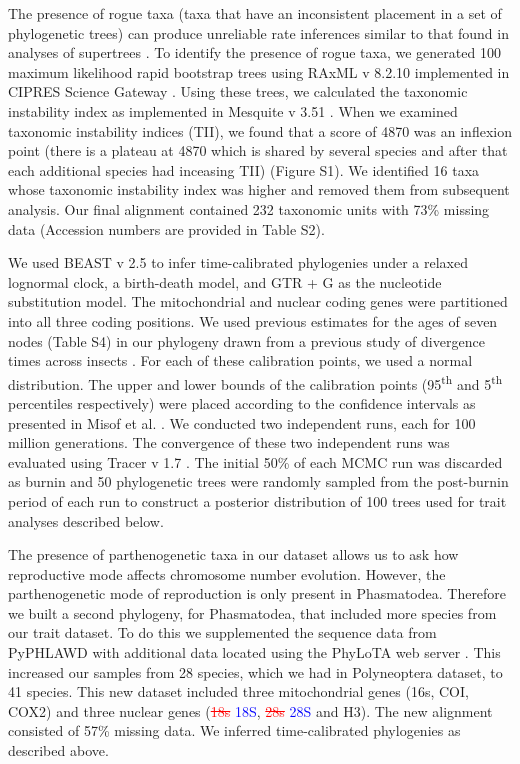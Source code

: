 \documentclass[]{rsos}%
\begin{document}
The presence of rogue taxa (taxa that have an inconsistent placement in a set of phylogenetic trees) can produce unreliable rate inferences similar to that found in analyses of supertrees \cite{aberer2012roguetaxa, rabosky2015b}.
To identify the presence of rogue taxa, we generated 100 maximum likelihood rapid bootstrap trees using RAxML v 8.2.10 implemented in CIPRES Science Gateway \cite{stamatakis2014raxml,miller2010cipres}.
Using these trees, we calculated the taxonomic instability index as implemented in Mesquite v 3.51 \cite{maddison2018mesquite}.
When we examined taxonomic instability indices (TII), we found that a score of 4870 was an inflexion point (there is a plateau at 4870 which is shared by several species and after that each additional species had inceasing TII) (Figure S1).
We identified 16 taxa whose taxonomic instability index was higher and removed them from subsequent analysis.
Our final alignment contained 232 taxonomic units with 73\% missing data (Accession numbers are provided in Table S2).

We used BEAST v 2.5 \cite{bouckaert2014beast} to infer time-calibrated phylogenies under a relaxed lognormal clock, a birth-death model, and GTR + G as the nucleotide substitution model.
The mitochondrial and nuclear coding genes were partitioned into all three coding positions. 
We used previous estimates for the ages of seven nodes (Table S4) in our phylogeny drawn from a previous study of divergence times across insects \cite{misof2014phylogenomics}.
For each of these calibration points, we used a normal distribution.
The upper and lower bounds of the calibration points (95\textsuperscript{th} and 5\textsuperscript{th} percentiles respectively) were placed according to the confidence intervals as presented in Misof et al. \cite{misof2014phylogenomics}. 
We conducted two independent runs, each for 100 million generations.
The convergence of these two independent runs was evaluated using Tracer v 1.7 \cite{rambaut2018tracer}.
The initial 50\% of each MCMC run was discarded as burnin and 50 phylogenetic trees were randomly sampled from the post-burnin period of each run to construct a posterior distribution of 100 trees used for trait analyses described below.

The presence of parthenogenetic taxa in our dataset allows us to ask how reproductive mode affects chromosome number evolution.
However, the parthenogenetic mode of reproduction is only present in Phasmatodea.
Therefore we built a second phylogeny, for Phasmatodea, that included more species from our trait dataset.
To do this we supplemented the sequence data from PyPHLAWD with additional data located using the PhyLoTA web server \cite{sanderson2008}.
This increased our samples from 28 species, which we had in Polyneoptera dataset, to 41 species. 
This new dataset included three mitochondrial genes (16s, COI, COX2) and three
nuclear genes (\textcolor{red}{\st{18s}} \textcolor{blue}{18S}, \textcolor{red}{\st{28s}} \textcolor{blue}{28S} and H3).
The new alignment consisted of 57\% missing data.
We inferred time-calibrated phylogenies as described above.
\end{document}
